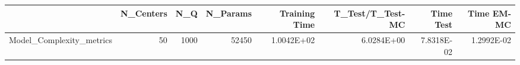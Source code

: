 \begin{tabular}{lrrrrrrr}
\toprule
{} &  N\_Centers &   N\_Q &  N\_Params &  Training Time &  T\_Test/T\_Test-MC &  Time Test &  Time EM-MC \\
\midrule
Model\_Complexity\_metrics &         50 &  1000 &     52450 &     1.0042E+02 &        6.0284E+00 & 7.8318E-02 &  1.2992E-02 \\
\bottomrule
\end{tabular}
